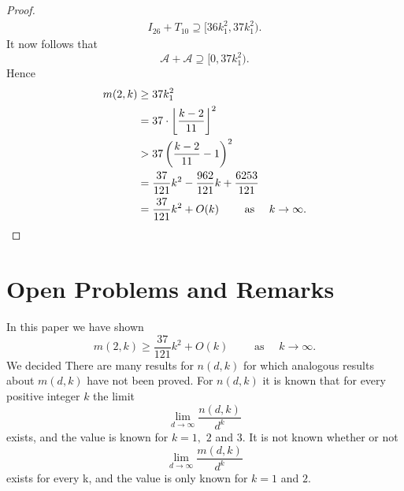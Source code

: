 \documentclass[11pt]{article}
\theoremstyle{definition}
\begin{document}
\begin{proof}
\begin{align*}
I_{26} + T_{10}  \supseteq [36k_1^2, 37k_1^2).
\end{align*}
It now follows that 
\[
\mathcal{A} + \mathcal{A} \supseteq [0, 37k_1^2).
\]
Hence
\begin{align*}
m(2,k) &\geq 37k_1^2\\
&= 37 \cdot \left \lfloor \frac{k - 2}{11}\right \rfloor^2\\
&> 37 \left(\frac{k - 2}{11} -1\right) ^2\\
&= \frac{37}{121}k^2-\frac{962}{121}k+\frac{6253}{121}\\
&= \frac{37}{121}k^2 + O(k)\qquad \text{ as }\quad k \to \infty. \qedhere
\end{align*}
\end{proof}
\section{Open Problems and Remarks}
In this paper we have shown 
\[ 
\displaystyle m(2,k) \geq \frac{37}{121}k^2 + O(k)\qquad \text{ as }\quad k \to \infty.
\]
We decided 
There are many results for $n(d,k)$ for which analogous results about $m(d,k)$ have not been proved.
For $n(d,k)$ it is known that for every positive integer $k$ the limit 
\[
\lim_{d \to \infty}{\frac{n(d,k)}{d^k}}
\]
exists, and the value is known for $k = 1,$ $2$ and $3$.  It is not known whether or not 
\[
\lim_{d \to \infty}{\frac{m(d,k)}{d^k}}
\]
exists for every k, and the value is only known for $k = 1$ and $2$.  
\newpage
	
		
\end{document}
